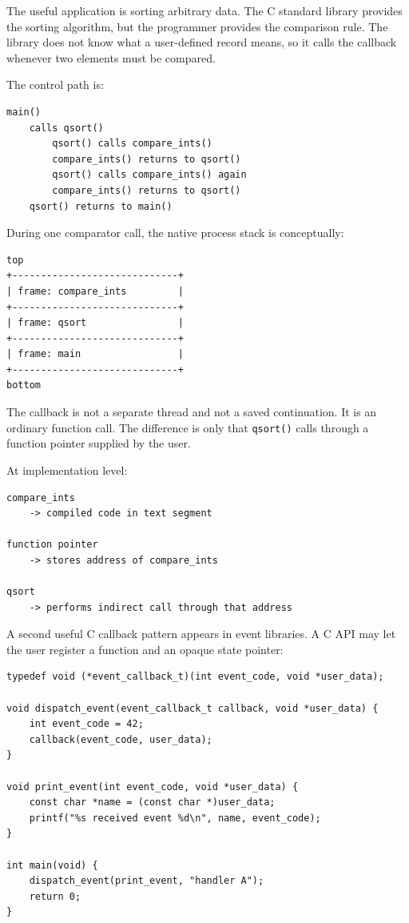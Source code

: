The useful application is sorting arbitrary data. The C standard library provides the sorting algorithm, but the programmer provides the comparison rule. The library does not know what a user-defined record means, so it calls the callback whenever two elements must be compared.

The control path is:

\begin{verbatim}
main()
    calls qsort()
        qsort() calls compare_ints()
        compare_ints() returns to qsort()
        qsort() calls compare_ints() again
        compare_ints() returns to qsort()
    qsort() returns to main()
\end{verbatim}

During one comparator call, the native process stack is conceptually:

\begin{verbatim}
top
+-----------------------------+
| frame: compare_ints         |
+-----------------------------+
| frame: qsort                |
+-----------------------------+
| frame: main                 |
+-----------------------------+
bottom
\end{verbatim}

The callback is not a separate thread and not a saved continuation. It is an ordinary function call. The difference is only that \texttt{qsort()} calls through a function pointer supplied by the user.

At implementation level:

\begin{verbatim}
compare_ints
    -> compiled code in text segment

function pointer
    -> stores address of compare_ints

qsort
    -> performs indirect call through that address
\end{verbatim}

A second useful C callback pattern appears in event libraries. A C API may let the user register a function and an opaque state pointer:

\begin{verbatim}
typedef void (*event_callback_t)(int event_code, void *user_data);

void dispatch_event(event_callback_t callback, void *user_data) {
    int event_code = 42;
    callback(event_code, user_data);
}

void print_event(int event_code, void *user_data) {
    const char *name = (const char *)user_data;
    printf("%s received event %d\n", name, event_code);
}

int main(void) {
    dispatch_event(print_event, "handler A");
    return 0;
}
\end{verbatim}

